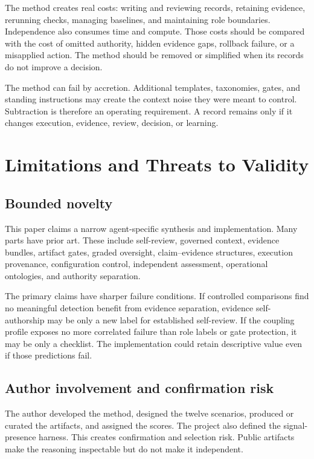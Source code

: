 \documentclass[11pt]{article}
\begin{document}
The method creates real costs: writing and reviewing records, retaining evidence, rerunning checks, managing baselines, and maintaining role boundaries. Independence also consumes time and compute. Those costs should be compared with the cost of omitted authority, hidden evidence gaps, rollback failure, or a misapplied action. The method should be removed or simplified when its records do not improve a decision.

The method can fail by accretion. Additional templates, taxonomies, gates, and standing instructions may create the context noise they were meant to control. Subtraction is therefore an operating requirement. A record remains only if it changes execution, evidence, review, decision, or learning.

\section{Limitations and Threats to Validity}
\label{sec:limitations}

\subsection{Bounded novelty}

This paper claims a narrow agent-specific synthesis and implementation. Many parts have prior art. These include self-review, governed context, evidence bundles, artifact gates, graded oversight, claim--evidence structures, execution provenance, configuration control, independent assessment, operational ontologies, and authority separation.

The primary claims have sharper failure conditions. If controlled comparisons find no meaningful detection benefit from evidence separation, evidence self-authorship may be only a new label for established self-review. If the coupling profile exposes no more correlated failure than role labels or gate protection, it may be only a checklist. The implementation could retain descriptive value even if those predictions fail.

\subsection{Author involvement and confirmation risk}

The author developed the method, designed the twelve scenarios, produced or curated the artifacts, and assigned the scores. The project also defined the signal-presence harness. This creates confirmation and selection risk. Public artifacts make the reasoning inspectable but do not make it independent.
\end{document}
